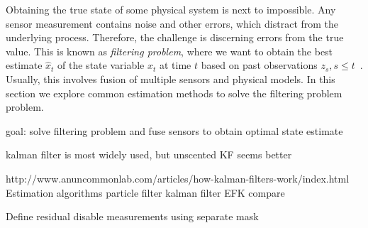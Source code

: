 Obtaining the true state of some physical system is next to impossible. Any sensor measurement contains noise and other errors, which distract from the underlying process. Therefore, the challenge is discerning errors from the true value. This is known as \textit{filtering problem}, where we want to obtain the best estimate $\hat{x}_t$ of the state variable $x_t$ at time $t$ based on past observations $z_s, s \leq t$~\cite[p.~67]{Mitter.1996}. Usually, this involves fusion of multiple sensors and physical models. In this section we explore common estimation methods to solve the filtering problem problem.

goal: solve filtering problem and fuse sensors to obtain optimal state estimate

kalman filter is most widely used, but unscented KF seems better~\cite[p.~401]{Julier.2004}


http://www.anuncommonlab.com/articles/how-kalman-filters-work/index.html
Estimation algorithms
particle filter
kalman filter
EFK
compare

Define residual
disable measurements using separate mask